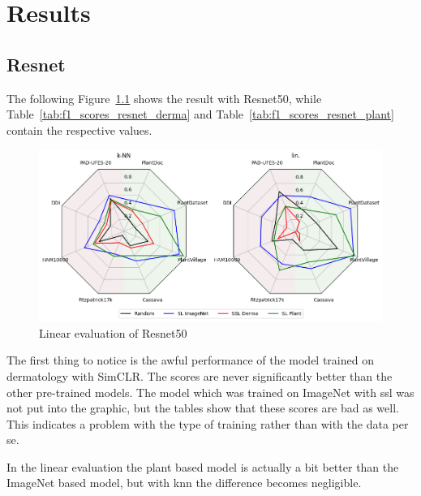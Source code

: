 \chapter{Results}

\section{Resnet}


The following Figure~\ref{fig:spider_resnet50} shows the result with Resnet50, while Table~\ref{tab:f1_scores_resnet_derma} and Table~\ref{tab:f1_scores_resnet_plant} contain the respective values.
\begin{figure}[H]
    \begin{center}
    \includegraphics[width=15cm]{../images/spider_resnet50.png}
    \caption{Linear evaluation of Resnet50}\label{fig:spider_resnet50}
    \end{center}
\end{figure}

The first thing to notice is the awful performance of the model trained on dermatology with SimCLR. The scores are never significantly better than the other pre-trained models. The model which was trained on ImageNet with \gls{ssl} was not put into the graphic, but the tables show that these scores are bad as well. 
This indicates a problem with the type of training rather than with the data per se.

In the linear evaluation the plant based model is actually a bit better than the ImageNet based model, but with \gls{knn} the difference becomes negligible.

